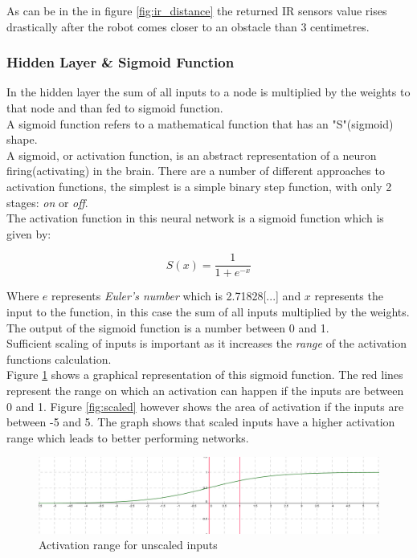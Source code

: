 
As can be in the in figure \ref{fig:ir_distance} the returned IR sensors value rises drastically after the robot comes closer to an obstacle than 3 centimetres. \\


\subsubsection{Hidden Layer \& Sigmoid Function}\label{sec:hiddenlayer}
In the hidden layer the sum of all inputs to a node is multiplied by the weights to that node and than fed to sigmoid function.\\

A sigmoid function refers to a mathematical function that has an "S"(sigmoid) shape.\\
A sigmoid, or activation function, is an abstract representation of a neuron firing(activating) in the brain. There are a number of different approaches to activation functions, the simplest is a simple binary step function, with only 2 stages: \textit{on} or \textit{off}.\\
The activation function in this neural network is a sigmoid function which is given by:

\begin{equation}
S(x) = \frac{1}{1 + e^{-x}}
\end{equation} 

Where $e$ represents \textit{Euler's number} which is 2.71828[...] and $x$ represents the input to the function, in this case the sum of all inputs multiplied by the weights.\\
The output of the sigmoid function is a number between 0 and 1.\\

Sufficient scaling of inputs is important as it increases the \textit{range} of the activation functions calculation. \\
Figure  \ref{fig:unscaled} shows a graphical representation of  this sigmoid function. The red lines represent the range on which an activation can happen if the inputs are between 0 and 1. Figure \ref{fig:scaled} however shows the area of activation if the inputs are between -5 and 5. The graph shows that scaled inputs have a higher activation range which leads to better performing networks. 

\begin{figure}[h]
\begin{center}
\includegraphics[scale=0.4]{Chapter2/images/unscaled.png}
\caption{Activation range for unscaled inputs}
\label{fig:unscaled}
\end{center}
\end{figure}

